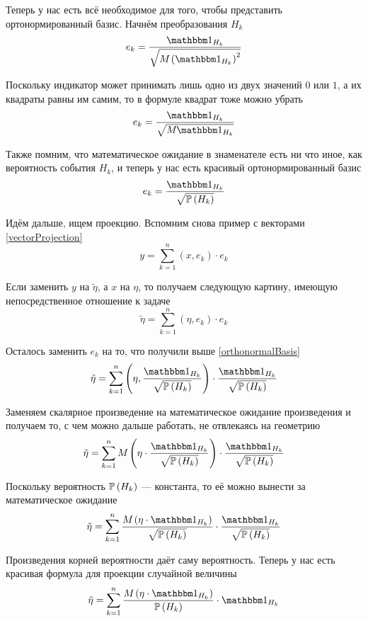 Теперь у нас есть всё необходимое для того,
чтобы представить ортонормированный базис.
Начнём преобразования $H_k$
$$e_k = \frac{\indicatorof{H_k}}
    {\sqrt{\mean{\left( \indicatorof{H_k} \right)^2}}}$$

Поскольку индикатор может принимать лишь одно из двух значений $0$ или $1$,
а их квадраты равны им самим, то в формуле квадрат тоже можно убрать
$$e_k = \frac{\indicatorof{H_k}}{\sqrt{\mean{\indicatorof{H_k}}}}$$

Также помним, что математическое ожидание в знаменателе есть ни что иное,
как вероятность события $H_k$,
и теперь у нас есть красивый ортонормированный базис
\begin{equation}\label{orthonormalBasis}
e_k = \frac{\indicatorof{H_k}}{\sqrt{\probability{H_k}}}
\end{equation}

Идём дальше, ищем проекцию.
Вспомним снова пример с векторами \eqref{vectorProjection}
$$y = \sum_{k=1}^n \left( x, e_k \right) \cdot e_k$$

Если заменить $y$ на $\tilde{\eta}$, а $x$ на $\eta$,
то получаем следующую картину, имеющую непосредственное отношение к задаче
$$\tilde{\eta} = \sum_{k=1}^n \left( \eta, e_k \right) \cdot e_k$$

Осталось заменить $e_k$ на то, что получили выше \eqref{orthonormalBasis}
$$\tilde{\eta}
    = \sum_{k=1}^n
        \left( \eta, \frac{\indicatorof{H_k}}{\sqrt{\probability{H_k}}} \right) 
        \cdot \frac{\indicatorof{H_k}}{\sqrt{\probability{H_k}}}$$

Заменяем скалярное произведение на математическое ожидание произведения
и получаем то, с чем можно дальше работать, не отвлекаясь на геометрию
$$\tilde{\eta}
    = \sum_{k=1}^n
        \mean{\left( \eta
            \cdot \frac{\indicatorof{H_k}}{\sqrt{\probability{H_k}}} \right)}
        \cdot \frac{\indicatorof{H_k}}{\sqrt{\probability{H_k}}}$$

Поскольку вероятность $\mathbb{P}\left( H_k \right)$ --- константа,
то её можно вынести за математическое ожидание
$$\tilde{\eta}
    = \sum_{k=1}^n
        \frac{\mean{\left( \eta \cdot \indicatorof{H_k} \right)}}
            {\sqrt{\probability{H_k}}}
        \cdot \frac{\indicatorof{H_k}}{\sqrt{\probability{H_k}}}$$

Произведения корней вероятности даёт саму вероятность.
Теперь у нас есть красивая формула для проекции случайной величины
\begin{equation}\label{discreteConditionalExpectation}
    \tilde{\eta} = \sum_{k=1}^n
        \frac{\mean{\left( \eta \cdot \indicatorof{H_k} \right)}}
            {\probability{H_k}}
        \cdot \indicatorof{H_k}
\end{equation}

